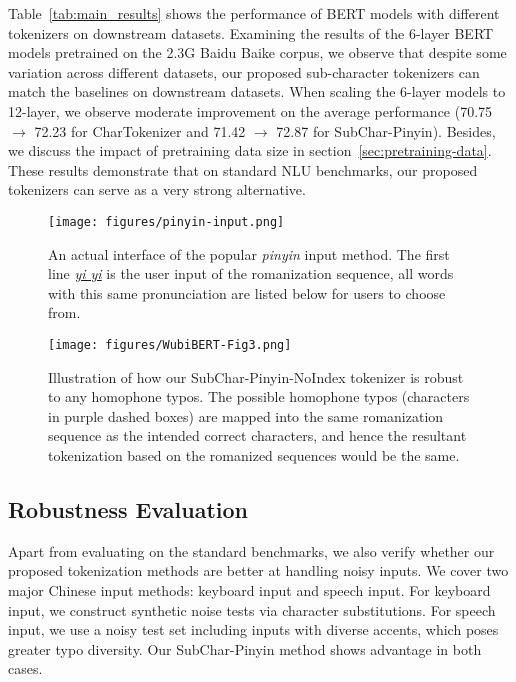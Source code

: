 Table~\ref{tab:main_results} shows the performance of BERT models with different tokenizers on downstream datasets. 
%
Examining the results of the 6-layer BERT models pretrained on the 2.3G Baidu Baike corpus, we observe that
%
despite some variation across different datasets, our proposed sub-character tokenizers can match the baselines on downstream datasets.
When scaling the 6-layer models to 12-layer, we observe moderate improvement on the average performance (70.75 $\rightarrow$ 72.23 for CharTokenizer and 71.42 $\rightarrow$ 72.87 for SubChar-Pinyin). 
Besides, we discuss the impact of pretraining data size in section~\ref{sec:pretraining-data}.
These results demonstrate that on standard NLU benchmarks, our proposed tokenizers can serve as a very strong alternative.



\begin{figure}[t]
\centering
\texttt{[image: figures/pinyin-input.png]}
\caption{An actual interface of the popular \textit{pinyin} input method. The first line \textit{\underline{yi yi}} is the user input of the romanization sequence, all words with this same pronunciation are listed below for users to choose from.}
\label{fig:pinyin}
\end{figure}



\begin{figure}[t]
\centering
\texttt{[image: figures/WubiBERT-Fig3.png]}
\caption{Illustration of how our SubChar-Pinyin-NoIndex tokenizer is robust to any homophone typos. The possible homophone typos (characters in purple dashed boxes) are mapped into the same romanization sequence as the intended correct characters, and hence the resultant tokenization based on the romanized sequences would be the same.}
\label{fig:no_index}
\end{figure}


\subsection{Robustness Evaluation}
\label{sec:noisy_eval}

Apart from evaluating on the standard benchmarks, we also verify whether our proposed tokenization methods are better at handling noisy inputs.
We cover two major Chinese input methods: keyboard input and speech input. 
For keyboard input, we construct synthetic noise tests via character substitutions. 
For speech input, we use a noisy test set including inputs with diverse accents, which poses greater typo diversity.  
Our SubChar-Pinyin method shows advantage in both cases.

